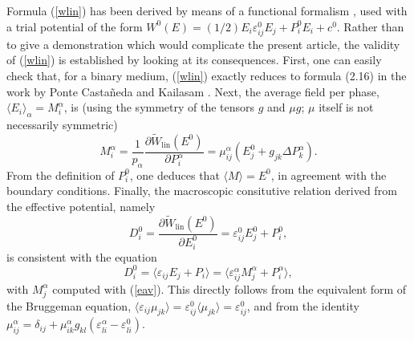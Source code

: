 Formula (\ref{wlin}) has been derived by means of a functional formalism
\cite{PELL99}, used with a trial potential of the form \cite{PELL99b}
$W^0(E)=(1/2)E_i\varepsilon^0_{ij} E_j+P^0_i E_i+c^0$. Rather than to
give a demonstration which would complicate the present article, the
validity of (\ref{wlin}) is established by looking at its consequences.
First, one can easily check that, for a binary medium, (\ref{wlin})
exactly reduces to formula (2.16) in the work by Ponte Casta\~{n}eda
and Kailasam \cite{PONT97}. Next, the average field per phase,
$\langle E_i\rangle_\alpha=M^\alpha_i$, is (using the symmetry of the
tensors $g$ and $\mu g$; $\mu$ itself is not necessarily symmetric)
\begin{equation}
\label{eav}
M^\alpha_i=\frac{1}{p_\alpha}\frac{\partial  \tilde{W}_{\text{lin}}(E^0)}{\partial P_i^\alpha}=\mu^\alpha_{ij}
( E^0_j+g_{jk}\Delta P_k^\alpha).
\end{equation}
From the definition of $P^0_i$, one deduces that $\langle M\rangle=E^0$,
in agreement with the boundary conditions. Finally, the macroscopic
consitutive relation derived from the effective potential, namely
\begin{equation}
D^0_i=\frac{\partial \tilde{W}_{\text{lin}}(E^0)}{\partial E^0_i}
=\varepsilon_{ij}^0 E^0_j+P^0_i,
\end{equation}
is consistent with the equation
\begin{equation}
D^0_i=\langle \varepsilon_{ij} E_j+P_i\rangle
=\langle\varepsilon^\alpha_{ij} M_j^\alpha +P_i^\alpha\rangle,
\end{equation}
with $M_j^\alpha$ computed with (\ref{eav}). This directly follows
from the equivalent form of the Bruggeman equation,
$\langle \varepsilon_{ij}\mu_{jk} \rangle=\varepsilon^0_{ij}\langle
\mu_{jk}\rangle=\varepsilon^0_{ij}$, and from the identity
$\mu_{ij}^\alpha=\delta_{ij}+\mu_{ik}^\alpha g_{kl}
(\varepsilon_{li}^\alpha-\varepsilon^0_{li})$.

